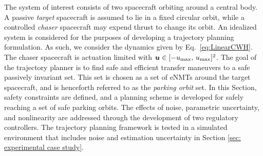 \documentclass[twocolumn,letterpaper]{IEEEAerospaceCLS}  %
\theoremstyle{definition}
\begin{document}
The system of interest consists of two spacecraft orbiting around a central body. 
A passive \emph{target} spacecraft is assumed to lie in a fixed circular orbit, while a controlled \emph{chaser} spacecraft may expend thrust to change its orbit. 
An idealized system is considered for the purposes of developing a trajectory planning formulation. As such, we consider the dynamics given by Eq.~\eqref{eq:LinearCWH}. The chaser spacecraft is actuation limited with $\boldsymbol{u}\in [-u_{\rm max}, \, u_{\rm max} ]^2$. The goal of the trajectory planner is to find safe and efficient transfer maneuvers to a safe passively invariant set. This set is chosen as a set of eNMTs around the target spacecraft, and is henceforth referred to as the \emph{parking orbit} set. 
In this Section, safety constraints are defined, and a planning scheme is developed for safely reaching a set of safe parking orbits.
The effects of noise, parametric uncertainty, and nonlinearity are addressed through
the development of two regulatory controllers. 
The trajectory planning framework is tested in a simulated environment that includes noise and estimation uncertainty in Section \ref{sec: experimental case study}. 
\end{document}
